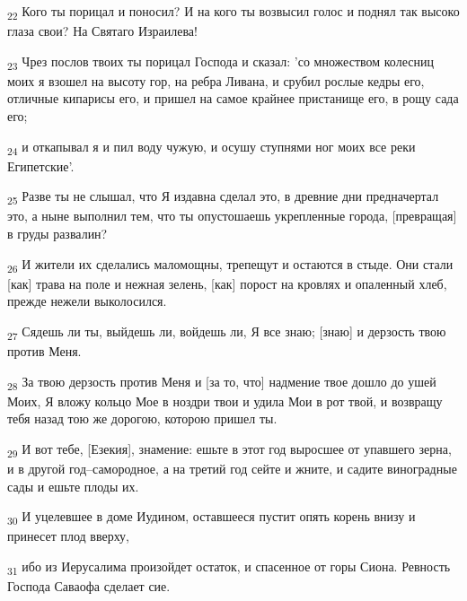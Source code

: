 \begin{tcolorbox}
\textsubscript{22} Кого ты порицал и поносил? И на кого ты возвысил голос и поднял так высоко глаза свои? На Святаго Израилева!
\end{tcolorbox}
\begin{tcolorbox}
\textsubscript{23} Чрез послов твоих ты порицал Господа и сказал: 'со множеством колесниц моих я взошел на высоту гор, на ребра Ливана, и срубил рослые кедры его, отличные кипарисы его, и пришел на самое крайнее пристанище его, в рощу сада его;
\end{tcolorbox}
\begin{tcolorbox}
\textsubscript{24} и откапывал я и пил воду чужую, и осушу ступнями ног моих все реки Египетские'.
\end{tcolorbox}
\begin{tcolorbox}
\textsubscript{25} Разве ты не слышал, что Я издавна сделал это, в древние дни предначертал это, а ныне выполнил тем, что ты опустошаешь укрепленные города, [превращая] в груды развалин?
\end{tcolorbox}
\begin{tcolorbox}
\textsubscript{26} И жители их сделались маломощны, трепещут и остаются в стыде. Они стали [как] трава на поле и нежная зелень, [как] порост на кровлях и опаленный хлеб, прежде нежели выколосился.
\end{tcolorbox}
\begin{tcolorbox}
\textsubscript{27} Сядешь ли ты, выйдешь ли, войдешь ли, Я все знаю; [знаю] и дерзость твою против Меня.
\end{tcolorbox}
\begin{tcolorbox}
\textsubscript{28} За твою дерзость против Меня и [за то, что] надмение твое дошло до ушей Моих, Я вложу кольцо Мое в ноздри твои и удила Мои в рот твой, и возвращу тебя назад тою же дорогою, которою пришел ты.
\end{tcolorbox}
\begin{tcolorbox}
\textsubscript{29} И вот тебе, [Езекия], знамение: ешьте в этот год выросшее от упавшего зерна, и в другой год--самородное, а на третий год сейте и жните, и садите виноградные сады и ешьте плоды их.
\end{tcolorbox}
\begin{tcolorbox}
\textsubscript{30} И уцелевшее в доме Иудином, оставшееся пустит опять корень внизу и принесет плод вверху,
\end{tcolorbox}
\begin{tcolorbox}
\textsubscript{31} ибо из Иерусалима произойдет остаток, и спасенное от горы Сиона. Ревность Господа Саваофа сделает сие.
\end{tcolorbox}

